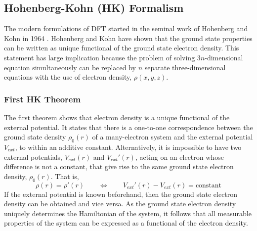 
\subsection{Hohenberg-Kohn (HK) Formalism}
The modern formulations of DFT started in the seminal work of Hohenberg and Kohn in 1964 \citep{Hohenberg1964}. Hohenberg and Kohn have shown that the ground state properties can be written as unique functional of the ground state electron density. This statement has large implication because the problem of solving 3$n$-dimensional equation simultaneously can be replaced by $n$ separate three-dimensional equations with the use of electron density, $\rho(x,y,z)$.
\subsubsection{First HK Theorem}
The first theorem shows that electron density is a unique functional of the external potential. It states that there is a one-to-one correspondence between the ground state density $\rho_0(r)$ of a many-electron system and the external potential $V_{ext}$, to within an additive constant. Alternatively, it is impossible to have two external potentials, $V_{ext}(r)$ and $V_{ext}'(r)$, acting on an electron whose difference is not a constant, that give rise to the same ground    state electron density, $\rho_0(r)$. That is,
\begin{equation}
	\rho(r) = \rho'(r) \quad \quad \Longleftrightarrow \quad \quad V_{ext}'(r) - V_{ext}(r) = \text{constant}
\end{equation}
If the external potential is known beforehand, then the ground state electron density can be obtained and vice versa. As the ground state electron density uniquely determines the Hamiltonian of the system, it follows that all measurable properties of the system can be expressed as a functional of the electron density.
